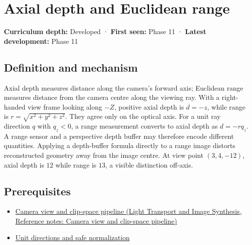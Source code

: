 \hypertarget{appendix-cac01ebeeb11}{}\label{referencestart:appendix-cac01ebeeb11}
\section{Axial depth and Euclidean range}\label{appendix-cac01ebeeb11-axial-depth-and-euclidean-range}

\hypertarget{appendix-cac01ebeeb11-axial-depth-and-euclidean-range}{}

\textbf{Curriculum depth:} Developed · \textbf{First seen:} Phase 11 · \textbf{Latest development:} Phase 11

\begin{allmightroledefinition}

\subsection{Definition and mechanism}\label{appendix-cac01ebeeb11-definition-and-mechanism}

\hypertarget{appendix-cac01ebeeb11-definition-and-mechanism}{}

Axial depth measures distance along the camera's forward axis; Euclidean range measures distance from the camera centre along the viewing ray. With a right-handed view frame looking along \(-Z\), positive axial depth is \(d=-z\), while range is \(r=\sqrt{x^2+y^2+z^2}\). They agree only on the optical axis. For a unit ray direction \(q\) with \(q_z<0\), a range measurement converts to axial depth as \(d=-rq_z\). A range sensor and a perspective depth buffer may therefore encode different quantities. Applying a depth-buffer formula directly to a range image distorts reconstructed geometry away from the image centre. At view point \((3,4,-12)\), axial depth is \(12\) while range is \(13\), a visible distinction off-axis.

\end{allmightroledefinition}

\subsection{Prerequisites}\label{appendix-cac01ebeeb11-prerequisites}

\hypertarget{appendix-cac01ebeeb11-prerequisites}{}

\begin{itemize}
\tightlist
\item
  \href{../04-Light-Transport-and-Image-Synthesis/main.pdf\#nameddest=appendix-1c07d64f5e70}{Camera view and clip-space pipeline (Light Transport and Image Synthesis, Reference notes: Camera view and clip-space pipeline)}
\item
  \hyperref[appendix-f744e41b95b4]{Unit directions and safe normalization}
\end{itemize}

